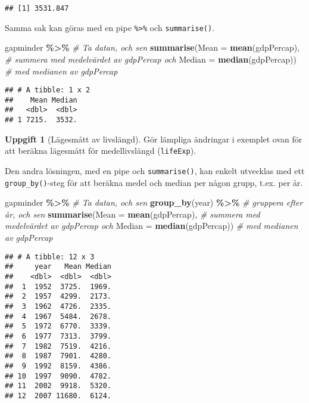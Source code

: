 \documentclass[
]{book}
\newenvironment{Shaded}{\begin{snugshade}}{\end{snugshade}}
\newcommand{\AttributeTok}[1]{\textcolor[rgb]{0.13,0.29,0.53}{#1}}
\newcommand{\CommentTok}[1]{\textcolor[rgb]{0.56,0.35,0.01}{\textit{#1}}}
\newcommand{\FunctionTok}[1]{\textcolor[rgb]{0.13,0.29,0.53}{\textbf{#1}}}
\newcommand{\NormalTok}[1]{#1}
\newcommand{\SpecialCharTok}[1]{\textcolor[rgb]{0.81,0.36,0.00}{\textbf{#1}}}
\theoremstyle{definition}
\theoremstyle{definition}
\theoremstyle{definition}
\newtheorem{exercise}{Uppgift}[chapter]
\theoremstyle{definition}
\theoremstyle{remark}
\begin{document}
\begin{verbatim}
## [1] 3531.847
\end{verbatim}

Samma sak kan göras med en pipe \texttt{\%\textgreater{}\%} och \texttt{summarise()}.

\begin{Shaded}
\begin{Highlighting}[]
\NormalTok{gapminder }\SpecialCharTok{\%\textgreater{}\%}                                    \CommentTok{\# Ta datan, och sen}
  \FunctionTok{summarise}\NormalTok{(}\AttributeTok{Mean =} \FunctionTok{mean}\NormalTok{(gdpPercap),              }\CommentTok{\# summera med medelvärdet av gdpPercap och}
            \AttributeTok{Median =} \FunctionTok{median}\NormalTok{(gdpPercap))          }\CommentTok{\# med medianen av gdpPercap}
\end{Highlighting}
\end{Shaded}

\begin{verbatim}
## # A tibble: 1 x 2
##    Mean Median
##   <dbl>  <dbl>
## 1 7215.  3532.
\end{verbatim}

\begin{exercise}[Lägesmått av livslängd]
Gör lämpliga ändringar i exemplet ovan för att beräkna lägesmått för medellivslängd (\texttt{lifeExp}).
\end{exercise}

Den andra lösningen, med en pipe och \texttt{summarise()}, kan enkelt utvecklas med ett \texttt{group\_by()}-steg för att beräkna medel och median per någon grupp, t.ex. per år.

\begin{Shaded}
\begin{Highlighting}[]
\NormalTok{gapminder }\SpecialCharTok{\%\textgreater{}\%}                                    \CommentTok{\# Ta datan, och sen}
  \FunctionTok{group\_by}\NormalTok{(year) }\SpecialCharTok{\%\textgreater{}\%}                             \CommentTok{\# gruppera efter år, och sen}
  \FunctionTok{summarise}\NormalTok{(}\AttributeTok{Mean =} \FunctionTok{mean}\NormalTok{(gdpPercap),              }\CommentTok{\# summera med medelvärdet av gdpPercap och}
            \AttributeTok{Median =} \FunctionTok{median}\NormalTok{(gdpPercap))          }\CommentTok{\# med medianen av gdpPercap}
\end{Highlighting}
\end{Shaded}

\begin{verbatim}
## # A tibble: 12 x 3
##     year   Mean Median
##    <dbl>  <dbl>  <dbl>
##  1  1952  3725.  1969.
##  2  1957  4299.  2173.
##  3  1962  4726.  2335.
##  4  1967  5484.  2678.
##  5  1972  6770.  3339.
##  6  1977  7313.  3799.
##  7  1982  7519.  4216.
##  8  1987  7901.  4280.
##  9  1992  8159.  4386.
## 10  1997  9090.  4782.
## 11  2002  9918.  5320.
## 12  2007 11680.  6124.
\end{verbatim}
\end{document}
